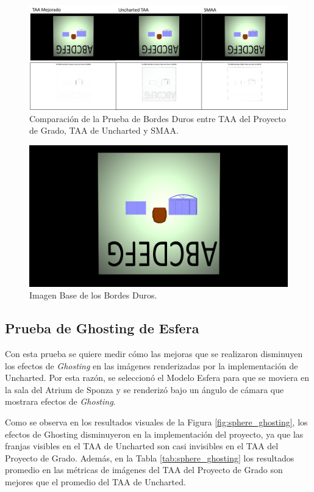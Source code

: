 \documentclass[pregrado]{tesis-usb} %
\begin{document}
\begin{figure}[!htb]
	\centering
	\includegraphics[scale=0.4]{images/results/hard_test.png}
	\caption{Comparación de la Prueba de Bordes Duros entre TAA del Proyecto de Grado, TAA de Uncharted y SMAA.}\label{fig:hard_test_render}
\end{figure}

\begin{figure}[!htb]
	\centering
	\includegraphics[scale=0.09]{images/results/hard_test_sobel_ground_truth.png}
	\caption{Imagen Base de los Bordes Duros.}\label{fig:hard_test_truth}
\end{figure}

\FloatBarrier

\subsection{Prueba de Ghosting de Esfera}
Con esta prueba se quiere medir cómo las mejoras que se realizaron disminuyen los efectos de \textit{Ghosting} en las imágenes renderizadas por la implementación de Uncharted. Por esta razón, se seleccionó el Modelo Esfera para que se moviera en la sala del Atrium de Sponza y se renderizó bajo un ángulo de cámara que mostrara efectos de \textit{Ghosting}.

Como se observa en los resultados visuales de la Figura \ref{fig:sphere_ghosting}, los efectos de  Ghosting disminuyeron en la implementación del proyecto, ya que las franjas visibles en el TAA de Uncharted son casi invisibles en el TAA del Proyecto de Grado. Además, en la Tabla \ref{tab:sphere_ghosting} los resultados promedio en las métricas de imágenes del TAA del Proyecto de Grado son mejores que el promedio del TAA de Uncharted.
\end{document}
